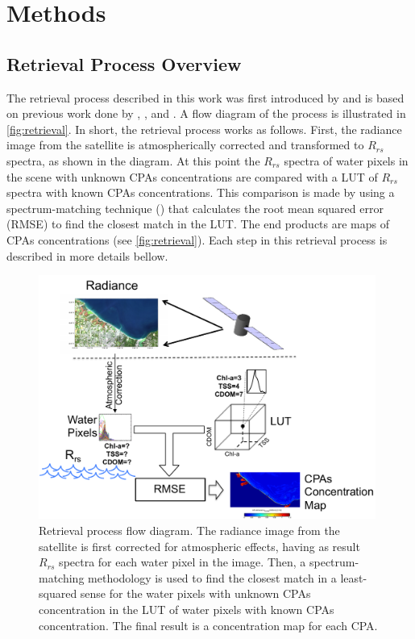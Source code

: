 \documentclass[onecolumn,3p,letterpaper]{elsarticle}
\begin{document}
\section{Methods}
\subsection{Retrieval Process Overview}
The retrieval process described in this work was first introduced by \cite*{Concha2013IGARSS} and is based on previous work done by \cite{Raqueno:2000}, \cite{Gerace:2012}, \cite{Pahlevan:2012} and \cite{Gerace:2013}. A flow diagram of the process is illustrated in \autoref{fig:retrieval}. In short, the retrieval process works as follows. First, the radiance image from the satellite is atmospherically corrected and transformed to $R_{rs}$ spectra, as shown in the diagram. At this point the $R_{rs}$ spectra of water pixels in the scene with unknown CPAs concentrations are compared with a LUT of $R_{rs}$ spectra with known CPAs concentrations. This comparison is made by using a spectrum-matching technique (\cite{Raqueno:2000,Mobley:2005}) that calculates the root mean squared error (RMSE) to find the closest match in the LUT. The end products are maps of CPAs concentrations (see \autoref{fig:retrieval}). Each step in this retrieval process is described in more details bellow.

\begin{figure}[htbp!]
	\centering
    \includegraphics[height=8cm]{./Images/Retrieval_RMSE.pdf}
    \caption{Retrieval process flow diagram. The radiance image from the satellite is first corrected for atmospheric effects, having as result $R_{rs}$ spectra for each water pixel in the image. Then, a spectrum-matching methodology is used to find the closest match in a least-squared sense for the water pixels with unknown CPAs concentration in the LUT of water pixels with known CPAs concentration. The final result is a concentration map for each CPA.  \label{fig:retrieval} }
\end{figure}
\end{document}
